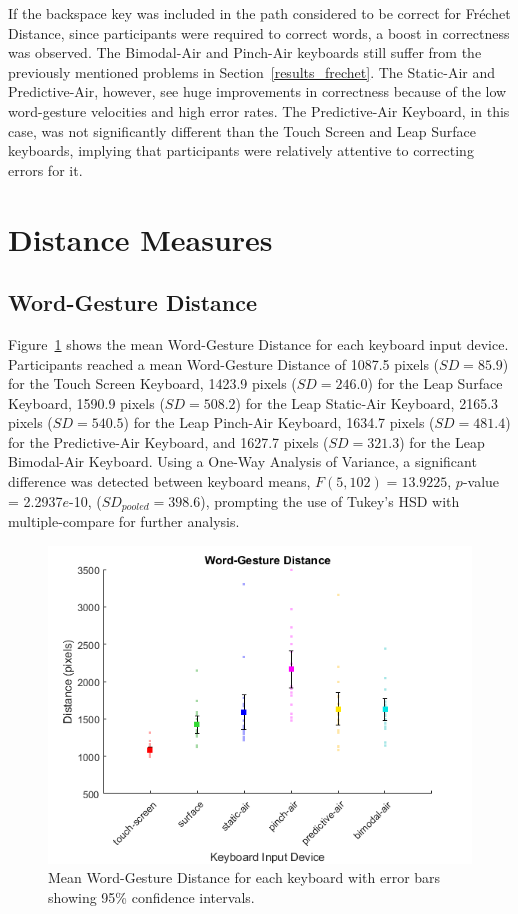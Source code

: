 If the backspace key was included in the path considered to be correct for Fr\'echet Distance, since participants were required to correct words, a boost in correctness was observed. The Bimodal-Air and Pinch-Air keyboards still suffer from the previously mentioned problems in Section~\ref{results_frechet}. The Static-Air and Predictive-Air, however, see huge improvements in correctness because of the low word-gesture velocities and high error rates. The Predictive-Air Keyboard, in this case, was not significantly different than the Touch Screen and Leap Surface keyboards, implying that participants were relatively attentive to correcting errors for it.

\section{Distance Measures}
\subsection{Word-Gesture Distance} \label{results_distance}
Figure~\ref{fig_distance_mean} shows the mean Word-Gesture Distance for each keyboard input device. Participants reached a mean Word-Gesture Distance of 1087.5 pixels ($SD = 85.9$) for the Touch Screen Keyboard, 1423.9 pixels ($SD = 246.0$) for the Leap Surface Keyboard, 1590.9 pixels ($SD = 508.2$) for the Leap Static-Air Keyboard, 2165.3 pixels ($SD = 540.5$) for the Leap Pinch-Air Keyboard, 1634.7 pixels ($SD = 481.4$) for the Predictive-Air Keyboard, and 1627.7 pixels ($SD = 321.3$) for the Leap Bimodal-Air Keyboard. Using a One-Way Analysis of Variance, a significant difference was detected between keyboard means, $F(5, 102) = 13.9225$, $p$-value = 2.2937$e$-10, ($SD_{pooled} = 398.6$), prompting the use of Tukey's HSD with multiple-compare for further analysis.

\begin{figure}[h]
	\centering
	\includegraphics{fig_distance_mean}
	\caption[Mean Word-Gesture Distance]{Mean Word-Gesture Distance for each keyboard with error bars showing 95\% confidence intervals.}
	\label{fig_distance_mean}
\end{figure}

